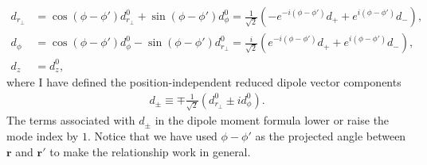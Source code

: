 \begin{align}
d_{r\!_\perp}\! &= \cos(\phi\!-\!\phi')d^0_{r\!_\perp}\!\!+\!\sin(\phi\!-\!\phi')d^0_\phi=\frac{1}{\sqrt{2}}\left(-e^{-i(\phi\!-\!\phi')}d_++e^{i(\phi\!-\!\phi')}d_- \right),\\
d_\phi &=\cos(\phi\!-\!\phi')d^0_\phi\!-\!\sin(\phi\!-\!\phi')d^0_{r\!_\perp}=\frac{i}{\sqrt{2}}\left(e^{-i(\phi\!-\!\phi')}d_++e^{i(\phi\!-\!\phi')}d_- \right),\\
d_z &= d^0_z,
\end{align}
where I have defined the position-independent reduced dipole vector components
\begin{align}
d_\pm \equiv \mp \frac{1}{\sqrt{2}}(d^0_{r\!_\perp}\pm id^0_{\phi}).
\end{align}
The terms associated with $d_\pm$ in the dipole moment formula lower or raise the mode index by $1$. Notice that we have used $\phi\!-\!\phi'$ as the projected angle between $\mathbf{r}$ and $\mathbf{r}'$ to make the relationship work in general. 

